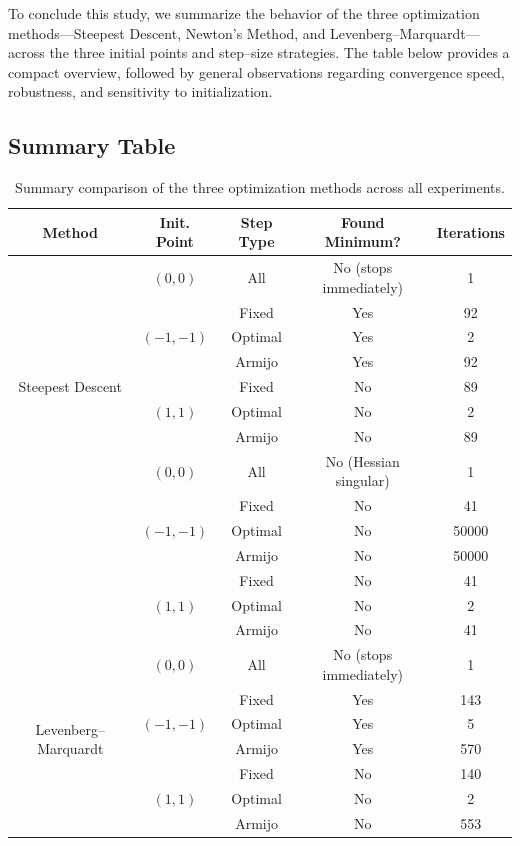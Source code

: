 \documentclass[11pt]{article}
\begin{document}
To conclude this study, we summarize the behavior of the three optimization methods—Steepest Descent, Newton’s Method, and Levenberg--Marquardt—across the three initial points and step–size strategies. The table below provides a compact overview, followed by general observations regarding convergence speed, robustness, and sensitivity to initialization.

\subsection*{Summary Table}

\begin{table}[H]
\centering
\begin{tabular}{c|c|c|c|c}
\textbf{Method} & \textbf{Init. Point} & \textbf{Step Type} & \textbf{Found Minimum?} & \textbf{Iterations} \\
\hline
\multirow{9}{*}{Steepest Descent}
& $(0,0)$ & All & No (stops immediately) & 1 \\
& \multirow{3}{*}{$(-1,-1)$}
& Fixed   & Yes & 92 \\
& & Optimal & Yes & 2 \\
& & Armijo  & Yes & 92 \\
& \multirow{3}{*}{$(1,1)$}
& Fixed   & No & 89 \\
& & Optimal & No & 2 \\
& & Armijo  & No & 89 \\
\hline
\multirow{9}{*}{Newton}
& $(0,0)$ & All & No (Hessian singular) & 1 \\
& \multirow{3}{*}{$(-1,-1)$}
& Fixed   & No & 41 \\
& & Optimal & No & 50000 \\
& & Armijo  & No & 50000 \\
& \multirow{3}{*}{$(1,1)$}
& Fixed   & No & 41 \\
& & Optimal & No & 2 \\
& & Armijo  & No & 41 \\
\hline
\multirow{9}{*}{Levenberg--Marquardt}
& $(0,0)$ & All & No (stops immediately) & 1 \\
& \multirow{3}{*}{$(-1,-1)$}
& Fixed   & Yes & 143 \\
& & Optimal & Yes & 5 \\
& & Armijo  & Yes & 570 \\
& \multirow{3}{*}{$(1,1)$}
& Fixed   & No & 140 \\
& & Optimal & No & 2 \\
& & Armijo  & No & 553 \\
\end{tabular}
\caption{Summary comparison of the three optimization methods across all experiments.}
\end{table}
\end{document}
